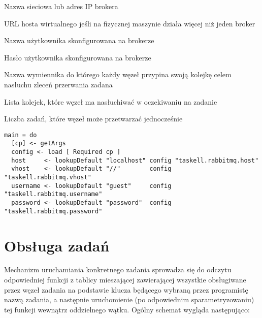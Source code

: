 \begin{description}[align=right,labelwidth=10cm,leftmargin=6cm]
  \item[taskell.rabbitmq.host] Nazwa sieciowa lub adres IP brokera
  \item[taskell.rabbitmq.vhost] URL hosta wirtualnego jeśli na fizycznej maszynie działa więcej niż jeden broker
  \item[taskell.rabbitmq.username] Nazwa użytkownika skonfigurowana na brokerze
  \item[taskell.rabbitmq.password] Hasło użytkownika skonfigurowana na brokerze
  \item[taskell.abortExchange] Nazwa wymiennika do którego każdy węzeł przypina swoją kolejkę celem nasłuchu zleceń przerwania zadana
  \item[taskell.queues] Lista kolejek, które węzeł ma nasłuchiwać w oczekiwaniu na zadanie
  \item[taskell.parallelism] Liczba zadań, które węzeł może przetwarzać jednocześnie
\end{description}
\begin{lstlisting}[caption=Odczyt konfiguracji]
main = do
  [cp] <- getArgs
  config <- load [ Required cp ]
  host     <- lookupDefault "localhost" config "taskell.rabbitmq.host"
  vhost    <- lookupDefault "//"        config "taskell.rabbitmq.vhost"
  username <- lookupDefault "guest"     config "taskell.rabbitmq.username"
  password <- lookupDefault "password"  config "taskell.rabbitmq.password"
\end{lstlisting}
\newpage
\section{Obsługa zadań}
Mechanizm uruchamiania konkretnego zadania sprowadza się do odczytu odpowiedniej funkcji z tablicy mieszającej zawierającej wszystkie obsługiwane przez węzeł zadania na podstawie klucza będącego wybraną przez programistę nazwą zadania, a następnie uruchomienie (po odpowiednim sparametryzowaniu) tej funkcji wewnątrz oddzielnego wątku. Ogólny schemat wygląda następująco:

